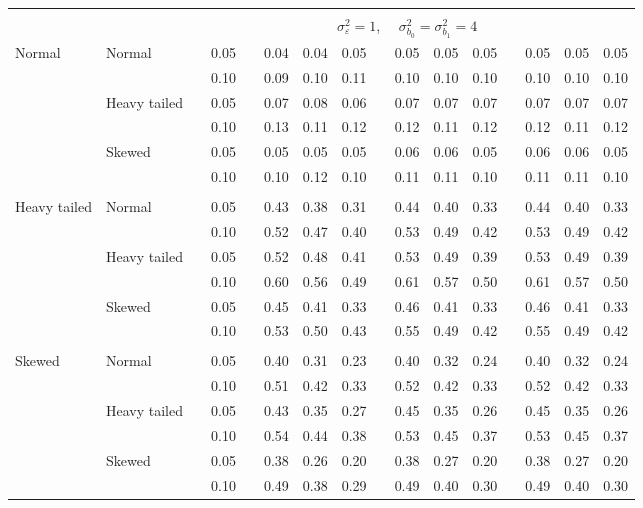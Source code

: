 \documentclass[12pt]{article} %
\begin{document}
\begin{table}[ht]
\begin{scriptsize}
\begin{center}
\begin{tabular}{ll p{.1cm} c p{.1cm} rrr p{.1cm} rrr p{.1cm} rrr}
&&&&&&&&&&&&&&&\\
& && && \multicolumn{9}{c}{$\sigma_{\varepsilon}^2 = 1$, \ \ $\sigma_{b_0}^2 = \sigma_{b_1}^2 = 4$} \\ \cline{6-16}
\rowcolor{gray!20}Normal       & Normal       && 0.05 &&   0.04 & 0.04 & 0.05 && 0.05 & 0.05 & 0.05 && 0.05 & 0.05 & 0.05 \\ 
\rowcolor{gray!20}             &              && 0.10 &&   0.09 & 0.10 & 0.11 && 0.10 & 0.10 & 0.10 && 0.10 & 0.10 & 0.10 \\ 
\rowcolor{gray!20}             & Heavy tailed && 0.05 &&   0.07 & 0.08 & 0.06 && 0.07 & 0.07 & 0.07 && 0.07 & 0.07 & 0.07 \\ 
\rowcolor{gray!20}             &              && 0.10 &&   0.13 & 0.11 & 0.12 && 0.12 & 0.11 & 0.12 && 0.12 & 0.11 & 0.12 \\ 
\rowcolor{gray!20}             & Skewed       && 0.05 &&   0.05 & 0.05 & 0.05 && 0.06 & 0.06 & 0.05 && 0.06 & 0.06 & 0.05 \\ 
\rowcolor{gray!20}             &              && 0.10 &&   0.10 & 0.12 & 0.10 && 0.11 & 0.11 & 0.10 && 0.11 & 0.11 & 0.10 \\ 
             &&&&&&&&&&&&&&&\\
Heavy tailed & Normal       && 0.05 &&   0.43 & 0.38 & 0.31 && 0.44 & 0.40 & 0.33 && 0.44 & 0.40 & 0.33 \\ 
             &              && 0.10 &&   0.52 & 0.47 & 0.40 && 0.53 & 0.49 & 0.42 && 0.53 & 0.49 & 0.42 \\ 
             & Heavy tailed && 0.05 &&   0.52 & 0.48 & 0.41 && 0.53 & 0.49 & 0.39 && 0.53 & 0.49 & 0.39 \\ 
             &              && 0.10 &&   0.60 & 0.56 & 0.49 && 0.61 & 0.57 & 0.50 && 0.61 & 0.57 & 0.50 \\ 
             & Skewed       && 0.05 &&   0.45 & 0.41 & 0.33 && 0.46 & 0.41 & 0.33 && 0.46 & 0.41 & 0.33 \\ 
             &              && 0.10 &&   0.53 & 0.50 & 0.43 && 0.55 & 0.49 & 0.42 && 0.55 & 0.49 & 0.42 \\ 
             &&&&&&&&&&&&&&&\\
Skewed       & Normal       && 0.05 &&   0.40 & 0.31 & 0.23 && 0.40 & 0.32 & 0.24 && 0.40 & 0.32 & 0.24 \\ 
             &              && 0.10 &&   0.51 & 0.42 & 0.33 && 0.52 & 0.42 & 0.33 && 0.52 & 0.42 & 0.33 \\ 
             & Heavy tailed && 0.05 &&   0.43 & 0.35 & 0.27 && 0.45 & 0.35 & 0.26 && 0.45 & 0.35 & 0.26 \\ 
             &              && 0.10 &&   0.54 & 0.44 & 0.38 && 0.53 & 0.45 & 0.37 && 0.53 & 0.45 & 0.37 \\ 
             & Skewed       && 0.05 &&   0.38 & 0.26 & 0.20 && 0.38 & 0.27 & 0.20 && 0.38 & 0.27 & 0.20 \\ 
             &              && 0.10 &&   0.49 & 0.38 & 0.29 && 0.49 & 0.40 & 0.30 && 0.49 & 0.40 & 0.30 \\ 




\end{tabular}
\end{center}
\end{scriptsize}
\end{table}
\end{document}
